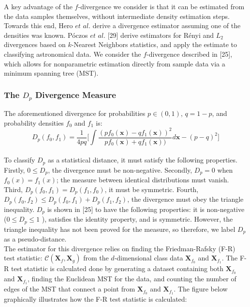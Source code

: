 \documentclass{article}
\begin{document}
	\indent A key advantage of the $f$-divergence we consider is that it can be estimated from the data samples themselves, without intermediate density estimation steps. Towards this end, Hero $et$ $al.$ derive a divergence estimator assuming one of the densities was known. P{\'o}czos $et$ $al.$ [29] derive estimators for R{\'e}nyi and $L_2$ divergences based on $k$-Nearest Neighbors statistics, and apply the estimate to classifying astronomical data. We consider the $f$-divergence described in [25], which allows for nonparametric estimation directly from sample data via a minimum spanning tree (MST). 
	\subsubsection{\small The $D_p$ Divergence Measure}
	The aforementioned divergence for probabilities $p\in (0,1)$, $q=1-p$, and probability densities $f_0$ and $f_1$ is:
	\begin{equation}
			D_p(f_0,f_1)=\frac{1}{4pq}\bigg[ \int \frac{(pf_0(\textbf{x})-qf_1(\textbf{x}))^2}{pf_0(\textbf{x})+qf_1(\textbf{x}))}d\textbf{x}-(p-q)^2 \bigg]
	\end{equation}
	\\[0.5ex]
	
	\indent To classify $D_p$ as a statistical distance, it must satisfy the following properties. Firstly, $0 \leq D_p$, the divergence must be non-negative. Secondly, $D_p=0$ when $f_0(x)=f_1(x)$; the measure between identical distributions must vanish. Third, $D_p(f_0,f_1)=D_p(f_1,f_0)$, it must be symmetric. Fourth,  $D_p(f_0,f_2) \leq D_p(f_0,f_1)+D_p(f_1,f_2)$, the divergence must obey the triangle inequality. $D_p$ is shown in [25] to have the following properties: it is non-negative ($0 \leq D_p \leq 1$ ), satisfies the identity property, and is symmetric. However, the triangle inequality has not been proved for the measure, so therefore, we label $D_p$ as a pseudo-distance.
	\\ [0.5 ex]
	
	\indent The estimator for this divergence relies on finding the Friedman-Rafsky (F-R) test statistic: $\mathcal{C}(\textbf{X}_f,\textbf{X}_g)$ from the $d$-dimensional class data $\textbf{X}_{f_0}$ and $\textbf{X}_{f_1}$. The F-R test statistic is calculated done by generating a dataset containing both $\textbf{X}_{f_0}$ and $\textbf{X}_{f_1}$, finding the Euclidean MST for the data, and counting the number of edges of the MST that connect a point from $\textbf{X}_{f_0}$ and $\textbf{X}_{f_1}$. The figure below graphically illustrates how the F-R test statistic is calculated: 
	\\ [0.5ex]
\end{document}
